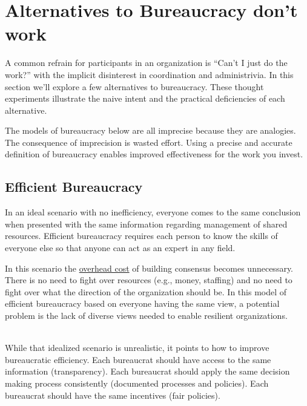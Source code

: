 \section{Alternatives to Bureaucracy don't work\label{sec:alternatives-to-bureaucracy}}
A common refrain for participants in an organization is ``Can't I just do the work?'' with the implicit disinterest in coordination and administrivia. In this section we'll explore a few alternatives to bureaucracy. These thought experiments illustrate the naive intent and the practical deficiencies of each alternative.

The models of bureaucracy below are all imprecise because they are analogies. The consequence of imprecision is wasted effort. Using a precise and accurate definition of bureaucracy enables improved effectiveness for the work you invest.



\subsection*{Efficient Bureaucracy}

In an ideal scenario with no inefficiency, everyone comes to the same conclusion when presented with the same information regarding management of shared resources. Efficient bureaucracy requires each person to know the skills of everyone else so that anyone can act as an expert in any field. 

In this scenario the 
\href{https://en.wikipedia.org/wiki/Overhead_(business)}{overhead cost} 
of building consensus becomes unnecessary. There is no need to fight over resources (e.g., money, staffing) and no need to fight over what the direction of the organization should be. In this model of efficient bureaucracy based on everyone having the same view, a potential problem is the lack of diverse views needed to enable resilient organizations.

\ \\

While that idealized scenario is unrealistic, it points to how to improve bureaucratic efficiency. Each bureaucrat should have access to the same information (transparency). 
Each bureaucrat should apply the same decision making process consistently (documented processes and policies).
Each bureaucrat should have the same incentives (fair policies).

